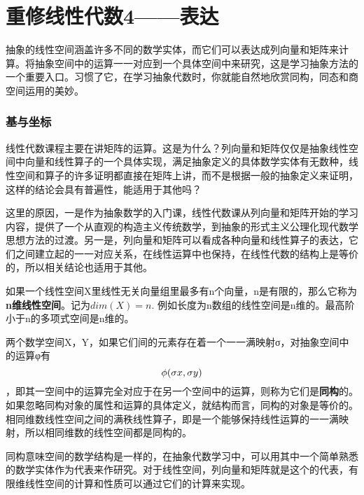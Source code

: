 \chapter{重修线性代数4——表达} 
抽象的线性空间涵盖许多不同的数学实体，而它们可以表达成列向量和矩阵来计算。将抽象空间中的运算一一对应到一个具体空间中来研究，这是学习抽象方法的一个重要入口。习惯了它，在学习抽象代数时，你就能自然地欣赏同构，同态和商空间运用的美妙。

\subsection{基与坐标}

线性代数课程主要在讲矩阵的运算。这是为什么？列向量和矩阵仅仅是抽象线性空间中向量和线性算子的一个具体实现，满足抽象定义的具体数学实体有无数种，线性空间和算子的许多证明都直接在矩阵上讲，而不是根据一般的抽象定义来证明，这样的结论会具有普遍性，能适用于其他吗？

这里的原因，一是作为抽象数学的入门课，线性代数课从列向量和矩阵开始的学习内容，提供了一个从直观的构造主义传统数学，到抽象的形式主义公理化现代数学思想方法的过渡。另一是，列向量和矩阵可以看成各种向量和线性算子的表达，它们之间建立起的一一对应关系，在线性运算中也保持，在线性代数的结构上是等价的，所以相关结论也适用于其他。

如果一个线性空间X里线性无关向量组里最多有n个向量，n是有限的，那么它称为\textbf{n维线性空间}。记为$ dim(X)=n $.  例如长度为n数组的线性空间是n维的。最高阶小于n的多项式空间是n维的。

两个数学空间X，Y，如果它们间的元素存在着一个一一满映射σ，对抽象空间中的运算φ有 %
\[{\rm{ }}\phi (\sigma x,\sigma y)\] ，即其一空间中的运算完全对应于在另一个空间中的运算，则称为它们是\textbf{同构}的。如果忽略同构对象的属性和运算的具体定义，就结构而言，同构的对象是等价的。相同维数线性空间之间的满秩线性算子，即是一个能够保持线性运算的一一满映射，所以相同维数的线性空间都是同构的。

同构意味空间的数学结构是一样的，在抽象代数学习中，可以用其中一个简单熟悉的数学实体作为代表来作研究。对于线性空间，列向量和矩阵就是这个的代表，有限维线性空间的计算和性质可以通过它们的计算来实现。

